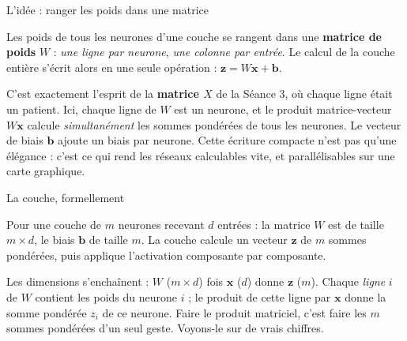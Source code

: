 \documentclass[aspectratio=169,11pt]{beamer}
\newcommand{\vx}{\mathbf{x}}
\newcommand{\va}{\mathbf{a}}
\newcommand{\vz}{\mathbf{z}}
\newcommand{\vb}{\mathbf{b}}
\begin{document}
\begin{frame}{L'idée : ranger les poids dans une matrice}
\begin{ucaddef}
{\small Les poids de tous les neurones d'une couche se rangent dans une \textbf{matrice de poids} $W$ : \emph{une ligne par neurone}, \emph{une colonne par entrée}. Le calcul de la couche entière s'écrit alors en une seule opération : $\vz = W\vx + \vb$.}
\end{ucaddef}
{\small C'est exactement l'esprit de la \textbf{matrice $X$} de la Séance 3, où chaque ligne était un patient. Ici, chaque ligne de $W$ est un neurone, et le produit matrice-vecteur $W\vx$ calcule \emph{simultanément} les sommes pondérées de tous les neurones. Le vecteur de biais $\vb$ ajoute un biais par neurone. Cette écriture compacte n'est pas qu'une élégance : c'est ce qui rend les réseaux calculables vite, et parallélisables sur une carte graphique.}
\end{frame}

\begin{frame}{La couche, formellement}
\begin{ucaddef}[Définition]
{\small Pour une couche de $m$ neurones recevant $d$ entrées : la matrice $W$ est de taille $m \times d$, le biais $\vb$ de taille $m$. La couche calcule un vecteur $\vz$ de $m$ sommes pondérées, puis applique l'activation composante par composante.}
\end{ucaddef}
\ucadformula{\vz = W\vx + \vb \qquad \va = f(\vz) \qquad W \in \mathbb{R}^{m\times d},\ \vx \in \mathbb{R}^{d},\ \vb \in \mathbb{R}^{m}}
{\small Les dimensions s'enchaînent : $W$ ($m \times d$) fois $\vx$ ($d$) donne $\vz$ ($m$). Chaque \emph{ligne} $i$ de $W$ contient les poids du neurone $i$ ; le produit de cette ligne par $\vx$ donne la somme pondérée $z_i$ de ce neurone. Faire le produit matriciel, c'est faire les $m$ sommes pondérées d'un seul geste. Voyons-le sur de vrais chiffres.}
\end{frame}
\end{document}
